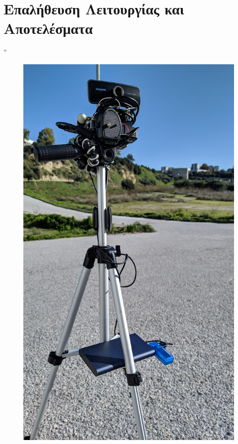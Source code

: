 \chapter{Επαλήθευση Λειτουργίας και Αποτελέσματα} %
\label{chap:Chapter6}

\epigraph{” }{\textit{}}



\begin{figure} [H]
	\centering
    \begin{minipage}{.5\textwidth}
      \centering
      \includegraphics[width=\linewidth, angle =-90]{../Images/Experiments-Results/node.jpg}\\

\end{minipage}
\end{figure}
